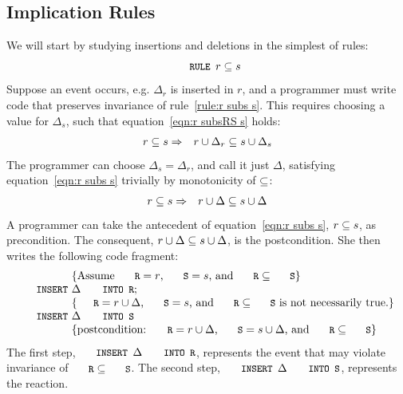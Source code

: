 \documentclass{svproc}
\begin{document}
\subsection{Implication Rules}
\label{ssct:Implication Rules}
	We will start by studying insertions and deletions in the simplest of rules:
\begin{equation}
\code{RULE }r\subs s\label{rule:r subs s}
\end{equation}
	Suppose an event occurs, e.g. $\Delta_r$ is inserted in $r$,
	and a programmer must write code that preserves invariance of rule~\ref{rule:r subs s}.
	This requires choosing a value for $\Delta_s$, such that equation~\ref{eqn:r subsRS s} holds:
\begin{eqnarray}
r\subseteq s&\Rightarrow&r\cup\Delta_r\subseteq s\cup \Delta_s\label{eqn:r subsRS s}
\end{eqnarray}
	The programmer can choose $\Delta_s=\Delta_r$, and call it just $\Delta$,
	satisfying equation~\ref{eqn:r subs s} trivially by monotonicity of $\subseteq$:
\begin{eqnarray}
r\subseteq s&\Rightarrow&r\cup\Delta\subseteq s\cup \Delta\label{eqn:r subs s}
\end{eqnarray}
	A programmer can take the antecedent of equation~\ref{eqn:r subs s}, $r\subseteq s$, as precondition.
	The consequent, $r\cup\Delta\subseteq s\cup \Delta$, is the postcondition.
	She then writes the following code fragment:
\[\begin{array}{r@{~}l}
&\{\text{Assume $\code{R}=r$, $\code{S}=s$, and $\code{R}\subs\code{S}$}\}\\
\code{INSERT}&\Delta\code{ INTO R};\\
&\{\text{$\code{R}=r\cup\Delta$, $\code{S}=s$, and $\code{R}\subs\code{S}$ is not necessarily true.}\}\\
\code{INSERT}&\Delta\code{ INTO S}\\
&\{\text{postcondition: $\code{R}=r\cup\Delta$, $\code{S}=s\cup\Delta$, and $\code{R}\subs\code{S}$}\}
\end{array}\]
	The first step, $\code{INSERT }\Delta\code{ INTO R}$, represents the event that may violate invariance of $\code{R}\subs\code{S}$.
	The second step, $\code{INSERT }\Delta\code{ INTO S}$, represents the reaction.
\end{document}
